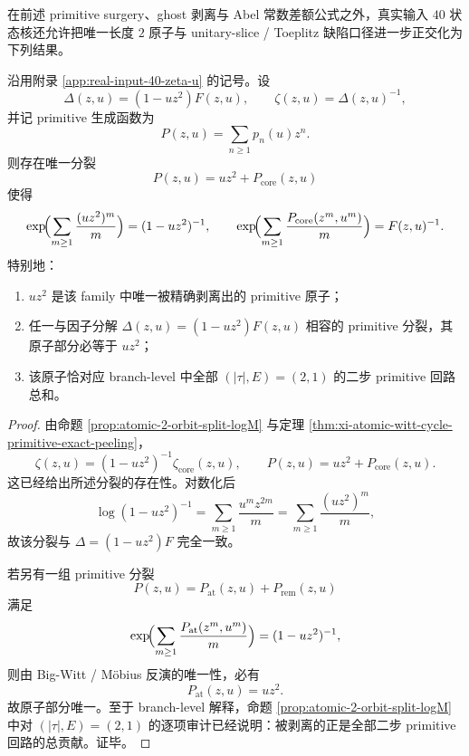 在前述 primitive surgery、ghost 剥离与 Abel 常数差额公式之外，真实输入 \(40\) 状态核还允许把唯一长度 \(2\) 原子与 unitary-slice / Toeplitz 缺陷口径进一步正交化为下列结果。

\begin{theorem}\label{thm:conclusion-realinput40-unique-primitive-two-step-atom}
沿用附录 \ref{app:real-input-40-zeta-u} 的记号。设
\[
\Delta(z,u)=(1-uz^2)F(z,u),
\qquad
\zeta(z,u)=\Delta(z,u)^{-1},
\]
并记 primitive 生成函数为
\[
P(z,u)=\sum_{n\ge 1}p_n(u)z^n.
\]
则存在唯一分裂
\[
P(z,u)=uz^2+P_{\mathrm{core}}(z,u)
\]
使得
\[
\exp\!\Bigl(\sum_{m\ge 1}\frac{(uz^2)^m}{m}\Bigr)=(1-uz^2)^{-1},
\qquad
\exp\!\Bigl(\sum_{m\ge 1}\frac{P_{\mathrm{core}}(z^m,u^m)}{m}\Bigr)=F(z,u)^{-1}.
\]
特别地：
\begin{enumerate}
  \item \(uz^2\) 是该 family 中唯一被精确剥离出的 primitive 原子；
  \item 任一与因子分解 \(\Delta(z,u)=(1-uz^2)F(z,u)\) 相容的 primitive 分裂，其原子部分必等于 \(uz^2\)；
  \item 该原子恰对应 branch-level 中全部 \((|\tau|,E)=(2,1)\) 的二步 primitive 回路总和。
\end{enumerate}
\end{theorem}
\begin{proof}
由命题 \ref{prop:atomic-2-orbit-split-logM} 与定理 \ref{thm:xi-atomic-witt-cycle-primitive-exact-peeling}，
\[
\zeta(z,u)=(1-uz^2)^{-1}\zeta_{\mathrm{core}}(z,u),
\qquad
P(z,u)=uz^2+P_{\mathrm{core}}(z,u).
\]
这已经给出所述分裂的存在性。对数化后
\[
\log(1-uz^2)^{-1}
=
\sum_{m\ge 1}\frac{u^m z^{2m}}{m}
=
\sum_{m\ge 1}\frac{(uz^2)^m}{m},
\]
故该分裂与 \(\Delta=(1-uz^2)F\) 完全一致。

若另有一组 primitive 分裂
\[
P(z,u)=P_{\mathrm{at}}(z,u)+P_{\mathrm{rem}}(z,u)
\]
满足
\[
\exp\!\Bigl(\sum_{m\ge 1}\frac{P_{\mathrm{at}}(z^m,u^m)}{m}\Bigr)=(1-uz^2)^{-1},
\]
则由 Big-Witt / M\"obius 反演的唯一性，必有
\[
P_{\mathrm{at}}(z,u)=uz^2.
\]
故原子部分唯一。至于 branch-level 解释，命题 \ref{prop:atomic-2-orbit-split-logM} 中对 \((|\tau|,E)=(2,1)\) 的逐项审计已经说明：被剥离的正是全部二步 primitive 回路的总贡献。证毕。
\end{proof}

